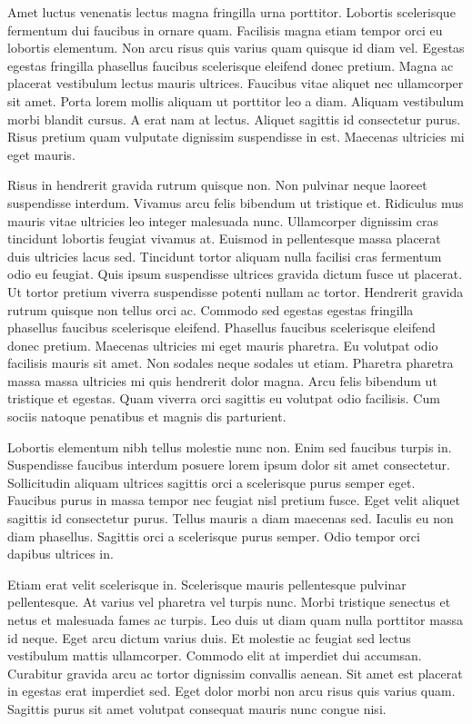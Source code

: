 \documentclass[11pt,a4paper]{article}
\begin{document}
Amet luctus venenatis lectus magna fringilla urna porttitor. Lobortis scelerisque fermentum dui faucibus in ornare quam. Facilisis magna etiam tempor orci eu lobortis elementum. Non arcu risus quis varius quam quisque id diam vel. Egestas egestas fringilla phasellus faucibus scelerisque eleifend donec pretium. Magna ac placerat vestibulum lectus mauris ultrices. Faucibus vitae aliquet nec ullamcorper sit amet. Porta lorem mollis aliquam ut porttitor leo a diam. Aliquam vestibulum morbi blandit cursus. A erat nam at lectus. Aliquet sagittis id consectetur purus. Risus pretium quam vulputate dignissim suspendisse in est. Maecenas ultricies mi eget mauris.

Risus in hendrerit gravida rutrum quisque non. Non pulvinar neque laoreet suspendisse interdum. Vivamus arcu felis bibendum ut tristique et. Ridiculus mus mauris vitae ultricies leo integer malesuada nunc. Ullamcorper dignissim cras tincidunt lobortis feugiat vivamus at. Euismod in pellentesque massa placerat duis ultricies lacus sed. Tincidunt tortor aliquam nulla facilisi cras fermentum odio eu feugiat. Quis ipsum suspendisse ultrices gravida dictum fusce ut placerat. Ut tortor pretium viverra suspendisse potenti nullam ac tortor. Hendrerit gravida rutrum quisque non tellus orci ac. Commodo sed egestas egestas fringilla phasellus faucibus scelerisque eleifend. Phasellus faucibus scelerisque eleifend donec pretium. Maecenas ultricies mi eget mauris pharetra. Eu volutpat odio facilisis mauris sit amet. Non sodales neque sodales ut etiam. Pharetra pharetra massa massa ultricies mi quis hendrerit dolor magna. Arcu felis bibendum ut tristique et egestas. Quam viverra orci sagittis eu volutpat odio facilisis. Cum sociis natoque penatibus et magnis dis parturient.

Lobortis elementum nibh tellus molestie nunc non. Enim sed faucibus turpis in. Suspendisse faucibus interdum posuere lorem ipsum dolor sit amet consectetur. Sollicitudin aliquam ultrices sagittis orci a scelerisque purus semper eget. Faucibus purus in massa tempor nec feugiat nisl pretium fusce. Eget velit aliquet sagittis id consectetur purus. Tellus mauris a diam maecenas sed. Iaculis eu non diam phasellus. Sagittis orci a scelerisque purus semper. Odio tempor orci dapibus ultrices in.

Etiam erat velit scelerisque in. Scelerisque mauris pellentesque pulvinar pellentesque. At varius vel pharetra vel turpis nunc. Morbi tristique senectus et netus et malesuada fames ac turpis. Leo duis ut diam quam nulla porttitor massa id neque. Eget arcu dictum varius duis. Et molestie ac feugiat sed lectus vestibulum mattis ullamcorper. Commodo elit at imperdiet dui accumsan. Curabitur gravida arcu ac tortor dignissim convallis aenean. Sit amet est placerat in egestas erat imperdiet sed. Eget dolor morbi non arcu risus quis varius quam. Sagittis purus sit amet volutpat consequat mauris nunc congue nisi.
\end{document}
